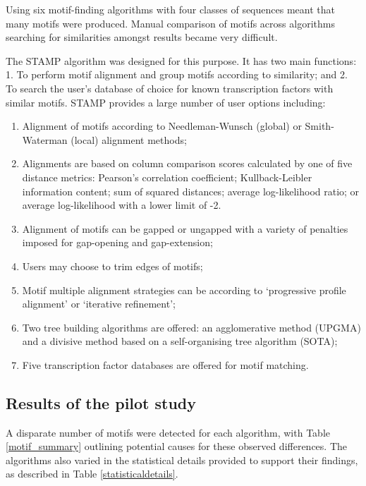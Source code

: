 \documentclass[12pt]{article}
\begin{document}
Using six motif-finding algorithms with four classes of sequences meant that many motifs were produced. Manual comparison of motifs across algorithms searching for similarities amongst results became very difficult. 

The STAMP algorithm \citep{mahony2007stamp} was designed for this purpose. It has two main functions:
1. To perform motif alignment and group motifs according to similarity; and
2. To search the user's database of choice for known transcription factors with similar motifs.  STAMP provides a large number of user options including:

\begin{enumerate}
\item Alignment of motifs according to Needleman-Wunsch (global) or Smith-Waterman (local) alignment methods;
\item Alignments are based on column comparison scores calculated by one of five distance metrics: Pearson's correlation coefficient; Kullback-Leibler information content; sum of squared distances; average log-likelihood ratio; or average log-likelihood with a lower limit of -2.
\item Alignment of motifs can be gapped or ungapped with a variety of penalties imposed for gap-opening and gap-extension;
\item Users may choose to trim edges of motifs;
\item Motif multiple alignment strategies can be according to `progressive profile alignment' or `iterative refinement';
\item  Two tree building algorithms are offered: an agglomerative method (UPGMA) and a divisive method based on a self-organising tree algorithm (SOTA);
\item Five transcription factor databases are offered for motif matching.
\end{enumerate}
\subsection{Results of the pilot study}

A disparate number of motifs were detected for each algorithm, with Table \ref{motif_summary} outlining potential causes for these observed differences. The algorithms also varied in the statistical details provided to support their findings, as described in Table \ref{statisticaldetails}.
\end{document}
